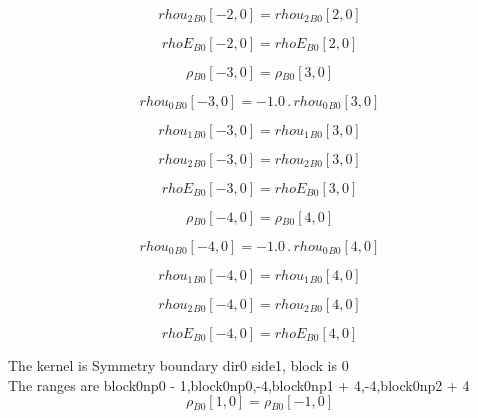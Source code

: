 \documentclass{article}
\begin{document}
\begin{dmath}{rhou_{2}{_{B0}}}[{-2,0}] = {rhou_{2}{_{B0}}}[{2,0}]\end{dmath}

\begin{dmath}{rhoE{_{B0}}}[{-2,0}] = {rhoE{_{B0}}}[{2,0}]\end{dmath}

\begin{dmath}{\rho{_{B0}}}[{-3,0}] = {\rho{_{B0}}}[{3,0}]\end{dmath}

\begin{dmath}{rhou_{0}{_{B0}}}[{-3,0}] = - 1.0 \,.\, {rhou_{0}{_{B0}}}[{3,0}]\end{dmath}

\begin{dmath}{rhou_{1}{_{B0}}}[{-3,0}] = {rhou_{1}{_{B0}}}[{3,0}]\end{dmath}

\begin{dmath}{rhou_{2}{_{B0}}}[{-3,0}] = {rhou_{2}{_{B0}}}[{3,0}]\end{dmath}

\begin{dmath}{rhoE{_{B0}}}[{-3,0}] = {rhoE{_{B0}}}[{3,0}]\end{dmath}

\begin{dmath}{\rho{_{B0}}}[{-4,0}] = {\rho{_{B0}}}[{4,0}]\end{dmath}

\begin{dmath}{rhou_{0}{_{B0}}}[{-4,0}] = - 1.0 \,.\, {rhou_{0}{_{B0}}}[{4,0}]\end{dmath}

\begin{dmath}{rhou_{1}{_{B0}}}[{-4,0}] = {rhou_{1}{_{B0}}}[{4,0}]\end{dmath}

\begin{dmath}{rhou_{2}{_{B0}}}[{-4,0}] = {rhou_{2}{_{B0}}}[{4,0}]\end{dmath}

\begin{dmath}{rhoE{_{B0}}}[{-4,0}] = {rhoE{_{B0}}}[{4,0}]\end{dmath}

\noindent The kernel is Symmetry boundary dir0 side1, block is 0\\\noindent The ranges are block0np0 - 1,block0np0,-4,block0np1 + 4,-4,block0np2 + 4\\\begin{dmath}{\rho{_{B0}}}[{1,0}] = {\rho{_{B0}}}[{-1,0}]\end{dmath}
\end{document}
